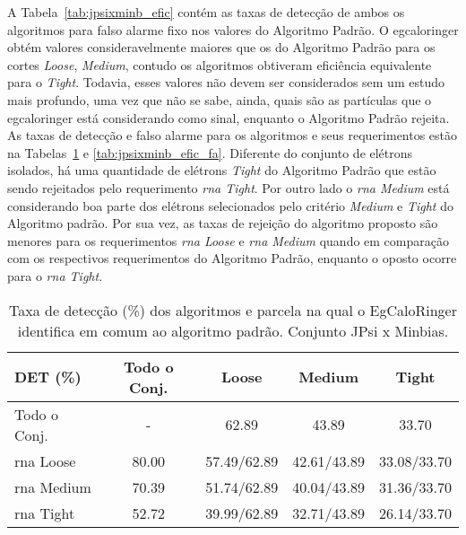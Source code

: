 A Tabela~\ref{tab:jpsixminb_efic} contém as taxas de detecção de ambos os
algoritmos para falso alarme fixo nos valores do Algoritmo Padrão. O
\gls{egcaloringer} obtém valores consideravelmente maiores que os do Algoritmo
Padrão para os cortes \emph{Loose}, \emph{Medium}, contudo os algoritmos
obtiveram eficiência equivalente para o \emph{Tight}. Todavia, esses valores não
devem ser considerados sem um estudo mais profundo, uma vez que não se sabe,
ainda, quais são as partículas que o \gls{egcaloringer} está considerando como
sinal, enquanto o Algoritmo Padrão rejeita. As taxas de detecção e falso alarme 
para os algoritmos e seus requerimentos estão na Tabelas~\ref{tab:jpsixminb_efic_det} 
e \ref{tab:jpsixminb_efic_fa}. Diferente do conjunto de elétrons isolados, há
uma quantidade de elétrons \emph{Tight} do Algoritmo Padrão que estão sendo
rejeitados pelo requerimento \emph{\gls{rna} Tight}. Por outro lado o
\emph{\gls{rna} Medium} está considerando boa parte dos elétrons selecionados
pelo critério \emph{Medium} e \emph{Tight} do Algoritmo padrão. Por sua vez, as
taxas de rejeição do algoritmo proposto são menores para os requerimentos
\emph{\gls{rna} Loose} e \emph{\gls{rna} Medium} quando em comparação com os
respectivos requerimentos do Algoritmo Padrão, enquanto o oposto ocorre para o
\emph{\gls{rna} Tight}.


\begin{table}[htb]
\centering
\begin{tabular}{l cccc}
\hline
\hline
DET (\%)& Todo o Conj. & Loose & Medium & Tight \\
\hline
Todo o Conj.      &     -  &  62.89      & 43.89       &  33.70      \\
\hline
\gls{rna} Loose   &  80.00 & 57.49/62.89 & 42.61/43.89 & 33.08/33.70 \\
\hline
\gls{rna} Medium  &  70.39 & 51.74/62.89 & 40.04/43.89 & 31.36/33.70 \\
\hline
\gls{rna} Tight   &  52.72 & 39.99/62.89 & 32.71/43.89 & 26.14/33.70 \\
\hline
\hline
\end{tabular}
\caption{Taxa de detecção (\%) dos algoritmos e parcela na qual o EgCaloRinger
identifica em comum ao algoritmo padrão. Conjunto JPsi x Minbias.}
\label{tab:jpsixminb_efic_det}
\end{table}


